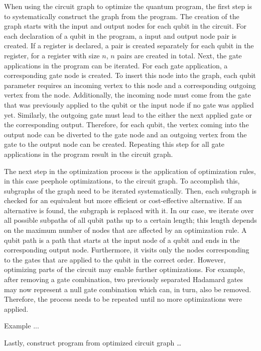 When using the circuit graph to optimize the quantum program, the first step is to systematically construct the graph from the program. The creation of the graph starts with the input and output nodes for each qubit in the circuit. For each declaration of a qubit in the program, a input and output node pair is created. If a register is declared, a pair is created separately for each qubit in the register, \ie for a register with size $n$, $n$ pairs are created in total. Next, the gate applications in the program can be iterated. For each gate application, a corresponding gate node is created. To insert this node into the graph, each qubit parameter requires an incoming vertex to this node and a corresponding outgoing vertex from the node. Additionally, the incoming node must come from the gate that was previously applied to the qubit or the input node if no gate was applied yet. Similarly, the outgoing gate must lead to the either the next applied gate or the corresponding output. Therefore, for each qubit, the vertex coming into the output node can be diverted to the gate node and an outgoing vertex from the gate to the output node can be created. Repeating this step for all gate applications in the program result in the circuit graph.  

The next step in the optimization process is the application of optimization rules, in this case peephole optimizations, to the circuit graph. To accomplish this, subgraphs of the graph need to be iterated systematically. Then, each subgraph is checked for an equivalent but more efficient or cost-effective alternative. If an alternative is found, the subgraph is replaced with it. In our case, we iterate over all possible subpaths of all qubit paths up to a certain length; this length depends on the maximum number of nodes that are affected by an optimization rule. A qubit path is a path that starts at the input node of a qubit and ends in the corresponding output node. Furthermore, it visits only the nodes corresponding to the gates that are applied to the qubit in the correct order. However, optimizing parts of the circuit may enable further optimizations. For example, after removing a gate combination, two previously separated Hadamard gates may now represent a null gate combination which can, in turn, also be removed. Therefore, the process needs to be repeated until no more optimizations were applied.

Example ...

Lastly, construct program from optimized circuit graph \dots 